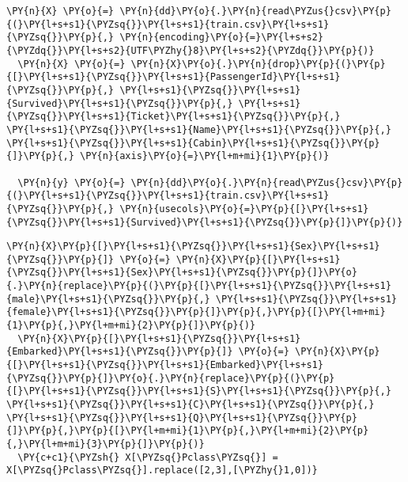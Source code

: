       \begin{tcolorbox}[breakable, size=fbox, boxrule=1pt, pad at break*=1mm,colback=cellbackground, colframe=cellborder]
  \begin{Verbatim}[commandchars=\\\{\}]
  \PY{n}{X} \PY{o}{=} \PY{n}{dd}\PY{o}{.}\PY{n}{read\PYZus{}csv}\PY{p}{(}\PY{l+s+s1}{\PYZsq{}}\PY{l+s+s1}{train.csv}\PY{l+s+s1}{\PYZsq{}}\PY{p}{,} \PY{n}{encoding}\PY{o}{=}\PY{l+s+s2}{\PYZdq{}}\PY{l+s+s2}{UTF\PYZhy{}8}\PY{l+s+s2}{\PYZdq{}}\PY{p}{)}
  \PY{n}{X} \PY{o}{=} \PY{n}{X}\PY{o}{.}\PY{n}{drop}\PY{p}{(}\PY{p}{[}\PY{l+s+s1}{\PYZsq{}}\PY{l+s+s1}{PassengerId}\PY{l+s+s1}{\PYZsq{}}\PY{p}{,} \PY{l+s+s1}{\PYZsq{}}\PY{l+s+s1}{Survived}\PY{l+s+s1}{\PYZsq{}}\PY{p}{,} \PY{l+s+s1}{\PYZsq{}}\PY{l+s+s1}{Ticket}\PY{l+s+s1}{\PYZsq{}}\PY{p}{,} \PY{l+s+s1}{\PYZsq{}}\PY{l+s+s1}{Name}\PY{l+s+s1}{\PYZsq{}}\PY{p}{,} \PY{l+s+s1}{\PYZsq{}}\PY{l+s+s1}{Cabin}\PY{l+s+s1}{\PYZsq{}}\PY{p}{]}\PY{p}{,} \PY{n}{axis}\PY{o}{=}\PY{l+m+mi}{1}\PY{p}{)}

  \PY{n}{y} \PY{o}{=} \PY{n}{dd}\PY{o}{.}\PY{n}{read\PYZus{}csv}\PY{p}{(}\PY{l+s+s1}{\PYZsq{}}\PY{l+s+s1}{train.csv}\PY{l+s+s1}{\PYZsq{}}\PY{p}{,} \PY{n}{usecols}\PY{o}{=}\PY{p}{[}\PY{l+s+s1}{\PYZsq{}}\PY{l+s+s1}{Survived}\PY{l+s+s1}{\PYZsq{}}\PY{p}{]}\PY{p}{)}
  \end{Verbatim}
  \end{tcolorbox}

      \begin{tcolorbox}[breakable, size=fbox, boxrule=1pt, pad at break*=1mm,colback=cellbackground, colframe=cellborder]
  \begin{Verbatim}[commandchars=\\\{\}]
  \PY{n}{X}\PY{p}{[}\PY{l+s+s1}{\PYZsq{}}\PY{l+s+s1}{Sex}\PY{l+s+s1}{\PYZsq{}}\PY{p}{]} \PY{o}{=} \PY{n}{X}\PY{p}{[}\PY{l+s+s1}{\PYZsq{}}\PY{l+s+s1}{Sex}\PY{l+s+s1}{\PYZsq{}}\PY{p}{]}\PY{o}{.}\PY{n}{replace}\PY{p}{(}\PY{p}{[}\PY{l+s+s1}{\PYZsq{}}\PY{l+s+s1}{male}\PY{l+s+s1}{\PYZsq{}}\PY{p}{,} \PY{l+s+s1}{\PYZsq{}}\PY{l+s+s1}{female}\PY{l+s+s1}{\PYZsq{}}\PY{p}{]}\PY{p}{,}\PY{p}{[}\PY{l+m+mi}{1}\PY{p}{,}\PY{l+m+mi}{2}\PY{p}{]}\PY{p}{)}
  \PY{n}{X}\PY{p}{[}\PY{l+s+s1}{\PYZsq{}}\PY{l+s+s1}{Embarked}\PY{l+s+s1}{\PYZsq{}}\PY{p}{]} \PY{o}{=} \PY{n}{X}\PY{p}{[}\PY{l+s+s1}{\PYZsq{}}\PY{l+s+s1}{Embarked}\PY{l+s+s1}{\PYZsq{}}\PY{p}{]}\PY{o}{.}\PY{n}{replace}\PY{p}{(}\PY{p}{[}\PY{l+s+s1}{\PYZsq{}}\PY{l+s+s1}{S}\PY{l+s+s1}{\PYZsq{}}\PY{p}{,} \PY{l+s+s1}{\PYZsq{}}\PY{l+s+s1}{C}\PY{l+s+s1}{\PYZsq{}}\PY{p}{,} \PY{l+s+s1}{\PYZsq{}}\PY{l+s+s1}{Q}\PY{l+s+s1}{\PYZsq{}}\PY{p}{]}\PY{p}{,}\PY{p}{[}\PY{l+m+mi}{1}\PY{p}{,}\PY{l+m+mi}{2}\PY{p}{,}\PY{l+m+mi}{3}\PY{p}{]}\PY{p}{)}
  \PY{c+c1}{\PYZsh{} X[\PYZsq{}Pclass\PYZsq{}] = X[\PYZsq{}Pclass\PYZsq{}].replace([2,3],[\PYZhy{}1,0])}
  \end{Verbatim}
  \end{tcolorbox}

